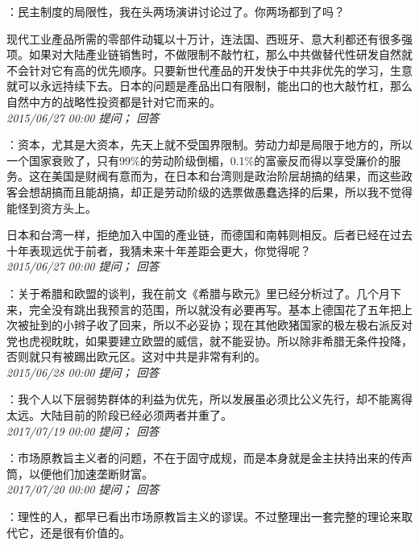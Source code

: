 \documentclass[twocolumn]{ctexart}
\begin{document}
：民主制度的局限性，我在头两场演讲讨论过了。你两场都到了吗？

现代工业產品所需的零部件动辄以十万计，连法国、西班牙、意大利都还有很多强项。如果对大陆產业链销售时，不做限制不敲竹杠，那么中共做替代性研发自然就不会针对它有高的优先顺序。只要新世代產品的开发快于中共非优先的学习，生意就可以永远持续下去。日本的问题是產品出口有限制，能出口的也大敲竹杠，那么自然中方的战略性投资都是针对它而来的。\\

\textit{\hfill\noindent\small 2015/06/27 00:00 提问； 回答}

：资本，尤其是大资本，先天上就不受国界限制。劳动力却是局限于地方的，所以一个国家衰败了，只有99\%的劳动阶级倒楣，0.1\%的富豪反而得以享受廉价的服务。这在美国是财阀有意而为，在日本和台湾则是政治阶层胡搞的结果，而这些政客会想胡搞而且能胡搞，却正是劳动阶级的选票做愚蠢选择的后果，所以我不觉得能怪到资方头上。

日本和台湾一样，拒绝加入中国的產业链，而德国和南韩则相反。后者已经在过去十年表现远优于前者，我猜未来十年差距会更大，你觉得呢？\\

\textit{\hfill\noindent\small 2015/06/27 00:00 提问； 回答}

：关于希腊和欧盟的谈判，我在前文《希腊与欧元》里已经分析过了。几个月下来，完全没有跳出我预言的范围，所以就没有必要再写。基本上德国花了五年把上次被扯到的小辫子收了回来，所以不必妥协；现在其他欧猪国家的极左极右派反对党也虎视眈眈，如果要建立欧盟的威信，就不能妥协。所以除非希腊无条件投降，否则就只有被踢出欧元区。这对中共是非常有利的。\\

\textit{\hfill\noindent\small 2015/06/28 00:00 提问； 回答}

：我个人以下层弱势群体的利益为优先，所以发展虽必须比公义先行，却不能离得太远。大陆目前的阶段已经必须两者并重了。\\

\textit{\hfill\noindent\small 2017/07/19 00:00 提问； 回答}

：市场原教旨主义者的问题，不在于固守成规，而是本身就是金主扶持出来的传声筒，以便他们加速垄断财富。\\

\textit{\hfill\noindent\small 2017/07/20 00:00 提问； 回答}

：理性的人，都早已看出市场原教旨主义的谬误。不过整理出一套完整的理论来取代它，还是很有价值的。\\
\end{document}
